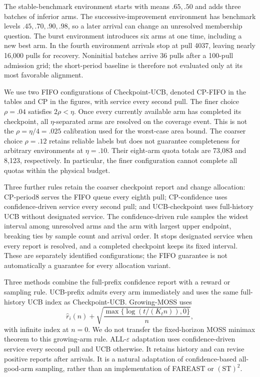 \documentclass[11pt]{article}
\theoremstyle{remark}
\begin{document}
The stable-benchmark environment starts with means $.65,.50$ and adds three
batches of inferior arms. The successive-improvement environment has
benchmark levels $.45,.70,.90,.98$, so a later arrival can change an
unresolved membership question. The burst environment introduces six arms
at one time, including a new best arm. In the fourth environment arrivals
stop at pull 4037, leaving nearly 16,000 pulls for recovery. Noninitial
batches arrive 36 pulls after a 100-pull admission grid; the short-period
baseline is therefore not evaluated only at its most favorable alignment.

We use two FIFO configurations of Checkpoint-UCB, denoted CP-FIFO in the
tables and CP in the figures, with service every second pull. The finer
choice $\rho=.04$ satisfies $2\rho<\eta$. Once every currently available
arm has completed its checkpoint, all $\eta$-separated arms are resolved
on the coverage event. This is not the
$\rho=\eta/4=.025$ calibration used for the worst-case area bound.
The coarser choice $\rho=.12$ retains reliable labels but does not guarantee
completeness for arbitrary environments at $\eta=.10$. Their eight-arm
quota totals are 73,083 and 8,123, respectively. In particular, the finer
configuration cannot complete all quotas within the physical budget.

Three further rules retain the coarser checkpoint report and change
allocation: CP-period8 serves the FIFO queue every eighth pull;
CP-confidence uses confidence-driven service every second pull; and
UCB-checkpoint uses full-history UCB without designated service. The
confidence-driven rule samples the widest interval among unresolved arms
and the arm with largest upper endpoint, breaking ties by sample count and
arrival order. It stops designated service when every report is resolved,
and a completed checkpoint keeps its fixed interval. These are separately
identified configurations; the FIFO guarantee is not automatically a
guarantee for every allocation variant.

Three methods combine the full-prefix confidence report with a reward or
sampling rule. UCB-prefix admits every arm immediately and uses the same
full-history UCB index as Checkpoint-UCB. Growing-MOSS uses
\[
 \hat r_i(n)+\sqrt{\frac{\max\{\log(t/(K_tn)),0\}}{n}},
\]
with infinite index at $n=0$. We do not transfer the fixed-horizon MOSS
minimax theorem to this growing-arm rule. ALL-$\varepsilon$ adaptation
uses confidence-driven service every second pull and UCB otherwise. It
retains history and can revise positive reports after arrivals. It is a
natural adaptation of confidence-based all-good-arm sampling, rather than
an implementation of FAREAST or $(\mathrm{ST})^2$.
\end{document}
